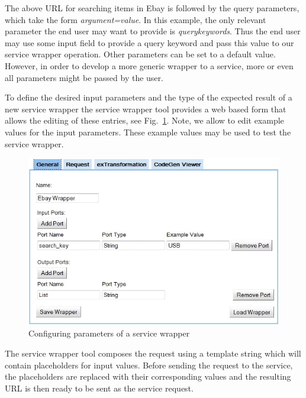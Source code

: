 The above URL for searching items in Ebay is followed by the query parameters, which take the form \textit{argument=value}. In this example, the only relevant parameter the end user may want to provide is \emph{querykeywords}. Thus the end user may use some input field to provide a query keyword and pass this value to our service wrapper operation. Other parameters can be set to a default value. However, in order to develop a more generic wrapper to a service, more or even all parameters might be passed by the user.

To define the desired input parameters and the type of the expected result of a new service wrapper the service wrapper tool provides a web based form that allows the editing of these entries, see Fig.~\ref{fig:construct_pre_post_conditions}. Note, we allow to edit example values for the input parameters. These example values may be used to test the service wrapper. 

\begin{figure}
  \begin{center} \includegraphics[width=\linewidth]{images/ServiceWrapperToolGVSWithPortDefinitions.png}
    \caption{Configuring parameters of a service wrapper}
    \label{fig:construct_pre_post_conditions}
  \end{center}
\end{figure}

The service wrapper tool composes the request using a template string which will contain placeholders for input values. Before sending the request to the service, the placeholders are replaced with their corresponding values and the resulting URL is then ready to be sent as the service request.

